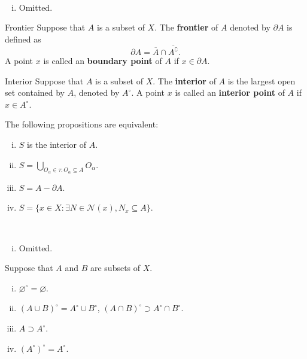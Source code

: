 \documentclass{report}
\begin{document}
\begin{prf}~\\ \vspace{-1em}
	\begin{enumerate}[(i)]
		\item Omitted.
	\end{enumerate}
\end{prf}


\begin{definition}{Frontier}{}
	Suppose that $A$ is a subset of $X$. The \textbf{frontier} of $A$ denoted by $\partial A$ is defined as
	\[
		\partial A=\overline{A}\cap\overline{A^{\complement}}.
	\] A point $x$ is called an \textbf{boundary point} of $A$ if $x\in \partial A$.
\end{definition}


\begin{definition}{Interior}{}
	Suppose that $A$ is a subset of $X$. The \textbf{interior} of $A$ is the largest open set contained by $A$, denoted by $A^{\circ}$. A point $x$ is called an \textbf{interior point} of $A$ if $x\in A^{\circ}$.
\end{definition}


\begin{proposition}{}{}
	The following propositions are equivalent:
	\begin{enumerate}[(i)]
		\item $S$ is the interior of $A$.
		\item $S=\bigcup\limits_{O_\alpha\in\tau:O_\alpha\subseteq A}O_\alpha$.
		\item $S=A-\partial A$.
		\item $S=\{x\in X:\exists N\in\mathcal{N}(x),N_x\subseteq A\}$.
	\end{enumerate}
\end{proposition}

\begin{prf}~\\ \vspace{-1em}
	\begin{enumerate}[(i)]
		\item Omitted.
	\end{enumerate}
\end{prf}

\begin{proposition}{}{}
	Suppose that $A$ and $B$ are subsets of $X$.
	\begin{enumerate}[(i)]
		\item $\varnothing^{\circ}=\varnothing$.
		\item $(A \cup B)^{\circ}=A^{\circ}\cup B^{\circ}$,  $(A \cap B)^{\circ}\supset A^{\circ}\cap B^{\circ}$.
		\item $A\supset A^{\circ}$.
		\item $\left(A^{\circ}\right)^{\circ}=A^{\circ}$.
	\end{enumerate}
\end{proposition}
\end{document}
